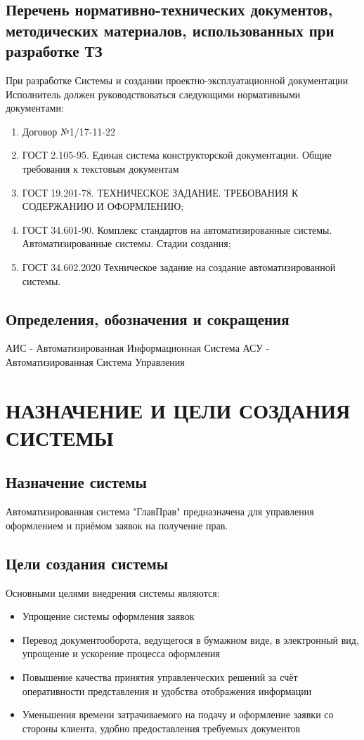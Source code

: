 \documentclass[russian, utf8, 12pt,pointsubsection,floatsubsection]{eskdtext}
\begin{document}
\subsection{Перечень нормативно-технических документов, методических материалов, использованных при разработке ТЗ}
При разработке Системы и создании проектно-эксплуатационной документации Исполнитель должен руководствоваться следующими нормативными документами:
\begin{enumerate}
    \item Договор №1/17-11-22
    \item ГОСТ 2.105-95. Единая система конструкторской документации. Общие требования к текстовым документам
    \item ГОСТ 19.201-78. ТЕХНИЧЕСКОЕ ЗАДАНИЕ. ТРЕБОВАНИЯ К СОДЕРЖАНИЮ И ОФОРМЛЕНИЮ;
    \item ГОСТ	34.601-90.	Комплекс	стандартов	на	автоматизированные системы. Автоматизированные системы. Стадии создания;
    \item ГОСТ 34.602.2020 Техническое задание на создание автоматизированной системы.
\end{enumerate}

\subsection{Определения, обозначения и сокращения}
АИС - Автоматизированная Информационная Система
АСУ - Автоматизированная Система Управления


\section{НАЗНАЧЕНИЕ И ЦЕЛИ СОЗДАНИЯ СИСТЕМЫ}
\subsection{Назначение системы}
Автоматизированная система "ГлавПрав" предназначена для управления оформлением и приёмом заявок на получение прав.

\subsection{Цели создания системы}
Основными целями внедрения системы являются:
\begin{itemize}
    \item Упрощение системы оформления заявок
    \item Перевод документооборота, ведущегося в бумажном виде, в электронный вид, упрощение и ускорение процесса оформления
    \item Повышение качества принятия управленческих решений за счёт оперативности представления и удобства отображения информации
    \item Уменьшения времени затрачиваемого на подачу и оформление заявки со стороны клиента, удобно предоставления требуемых документов
\end{itemize}
\end{document}
